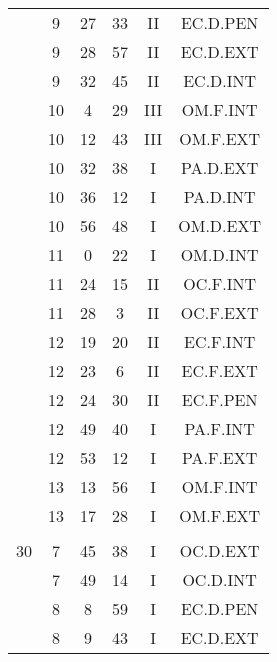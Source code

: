 \documentclass[12pt, a4paper]{article}
\begin{document}
\begin{multicols}{3}
{\begin{tabular}{c c c c c c}
	 	 	 	 & 9 & 27 & 33 & II & EC.D.PEN\\%
	 	 	 	 & 9 & 28 & 57 & II & EC.D.EXT\\%
	 	 	 	 & 9 & 32 & 45 & II & EC.D.INT\\%
	 	 	 	 & 10 & 4 & 29 & III & OM.F.INT\\%
	 	 	 	 & 10 & 12 & 43 & III & OM.F.EXT\\%
	 	 	 	 & 10 & 32 & 38 & I & PA.D.EXT\\%
	 	 	 	 & 10 & 36 & 12 & I & PA.D.INT\\%
	 	 	 	 & 10 & 56 & 48 & I & OM.D.EXT\\%
	 	 	 	 & 11 & 0 & 22 & I & OM.D.INT\\%
	 	 	 	 & 11 & 24 & 15 & II & OC.F.INT\\%
	 	 	 	 & 11 & 28 & 3 & II & OC.F.EXT\\%
	 	 	 	 & 12 & 19 & 20 & II & EC.F.INT\\%
	 	 	 	 & 12 & 23 & 6 & II & EC.F.EXT\\%
	 	 	 	 & 12 & 24 & 30 & II & EC.F.PEN\\%
	 	 	 	 & 12 & 49 & 40 & I & PA.F.INT\\%
	 	 	 	 & 12 & 53 & 12 & I & PA.F.EXT\\%
	 	 	 	 & 13 & 13 & 56 & I & OM.F.INT\\%
	 	 	 	 & 13 & 17 & 28 & I & OM.F.EXT\\%
	 	 	 	 & & & & & \\%
	 	 	 	30 & 7 & 45 & 38 & I & OC.D.EXT\\%
	 	 	 	 & 7 & 49 & 14 & I & OC.D.INT\\%
	 	 	 	 & 8 & 8 & 59 & I & EC.D.PEN\\%
	 	 	 	 & 8 & 9 & 43 & I & EC.D.EXT\\%

\end{tabular}}
\end{multicols}
\end{document}
